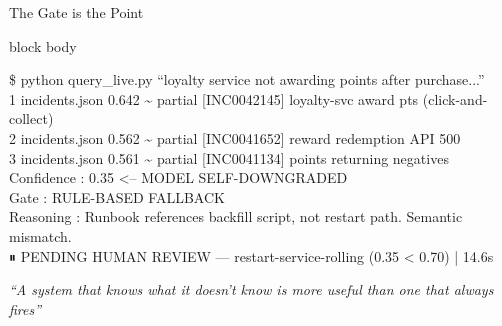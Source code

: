 \documentclass[aspectratio=169,10pt]{beamer}
\newenvironment{terminal}{%
  \begin{beamercolorbox}[sep=6pt,rounded=true,shadow=false]{block body}%
  \ttfamily\tiny\color{cterm}%
}{%
  \end{beamercolorbox}%
}
\begin{document}
\begin{frame}{The Gate is the Point}
  \vspace{0.3cm}
  \begin{terminal}
    \$ python query\_live.py ``loyalty service not awarding points after purchase...''\\
    \vspace{0.25em}
    \hspace*{0.3cm}1  incidents.json  0.642 \textasciitilde{} partial  [INC0042145] loyalty-svc award pts (click-and-collect)\\
    \hspace*{0.3cm}2  incidents.json  0.562 \textasciitilde{} partial  [INC0041652] reward redemption API 500\\
    \hspace*{0.3cm}3  incidents.json  0.561 \textasciitilde{} partial  [INC0041134] points returning negatives\\
    \vspace{0.25em}
    Confidence : {\color{camber}0.35  <-- MODEL SELF-DOWNGRADED}\\
    Gate       : {\color{camber}RULE-BASED FALLBACK}\\
    Reasoning  : Runbook references backfill script, not restart path. Semantic mismatch.\\
    \vspace{0.25em}
    {\color{camber}⏸  PENDING HUMAN REVIEW  —  restart-service-rolling  (0.35 < 0.70)}  |  14.6s\\
  \end{terminal}

  \vspace{0.2cm}
  {\color{cteal}\small\itshape ``A system that knows what it doesn't know is more useful than one that always fires''}
\end{frame}
\end{document}
